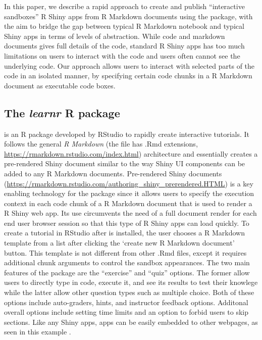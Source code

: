 In this paper, we describe a rapid approach to create and publish
``interactive sandboxes'' R Shiny apps from R Markdown documents using
the  package, with the aim to bridge the gap between
typical R Markdown notebook and typical Shiny apps in terms of levels of
abstraction. While code and markdown documents gives full details of the
code, standard R Shiny apps has too much limitations on users to
interact with the code and users often cannot see the underlying code.
Our approach allows users to interact with selected parts of the code in
an isolated manner, by specifying certain code chunks in a R Markdown
document as executable code boxes.

\hypertarget{the-learnr-r-package}{%
\subsection{\texorpdfstring{The \emph{learnr} R
package}{The learnr R package}}\label{the-learnr-r-package}}

 \citep{learnr} is an R package developed by RStudio to
rapidly create interactive tutorials. It follows the general \emph{R
Markdown} (the file has .Rmd extensions,
\url{https://rmarkdown.rstudio.com/index.html}) architecture and
essentially creates a pre-rendered Shiny document similar to the way
Shiny UI components can be added to any R Markdown documents.
Pre-rendered Shiny documents
(\url{https://rmarkdown.rstudio.com/authoring_shiny_prerendered.HTML})
is a key enabling technology for the  package since it
allows users to specify the execution context in each code chunk of a R
Markdown document that is used to render a R Shiny web app. Its use
circumvents the need of a full document render for each end user browser
session so that this type of R Shiny apps can load quickly. To create a
 tutorial in RStudio after  is
installed, the user chooses a  R Markdown template from
a list after clicking the `create new R Markdown document' button. This
template is not different from other .Rmd files, except it requires
additional chunk arguments to control the sandbox appearances. The two
main features of the  package are the ``exercise'' and
``quiz'' options. The former allow users to directly type in code,
execute it, and see its results to test their knowlege while the latter
allow other question types such as multiple choice. Both of these
options include auto-graders, hints, and instructor feedback options.
Additonal overall options include setting time limits and an option to
forbid users to skip sections. Like any Shiny apps, 
apps can be easily embedded to other webpages, as seen in this example
\citep{rmrwr}.

